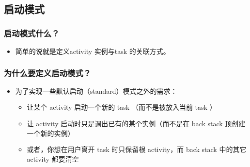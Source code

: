 \documentclass[9pt, b5paper]{article}
\begin{document}
\subsection{启动模式}
\label{sec-1-3}
\subsubsection{启动模式什么？}
\label{sec-1-3-1}
\begin{itemize}
\item 简单的说就是定义activity 实例与task 的关联方式。
\end{itemize}
\subsubsection{为什么要定义启动模式？}
\label{sec-1-3-2}
\begin{itemize}
\item 为了实现一些默认启动（standard）模式之外的需求：
\begin{itemize}
\item 让某个 activity 启动一个新的 task （而不是被放入当前 task ）
\item 让 activity 启动时只是调出已有的某个实例（而不是在 back stack 顶创建一个新的实例）　
\item 或者，你想在用户离开 task 时只保留根 activity，而 back stack 中的其它 activity 都要清空
\end{itemize}
\end{itemize}
\end{document}
